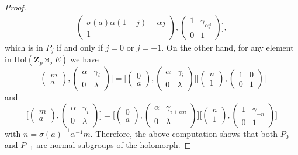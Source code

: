 \documentclass[12pt]{article}
\theoremstyle{definition}
\newcommand{\Z}{\mathbf Z}
\newcommand{\Hol}{\mathrm{Hol}}
\begin{document}
\begin{proof}
$$\begin{array}{l}
\begin{pmatrix}
	\sigma(a)\alpha(1+j)-\alpha j\\
	1
	\end{pmatrix}, \begin{pmatrix}
	1 &\gamma_{\alpha j}\\
	0 &1 
	\end{pmatrix}\Big],
\end{array}$$
which is in $P_j$ if and only if $j=0$ or $j=-1$.  
On the other hand, for any element in $\Hol(\Z_p\rtimes_{\sigma}E)$ we have
$$
\Big[\begin{pmatrix}
	m\\
	a
	\end{pmatrix}, \begin{pmatrix}
	\alpha &\gamma_{i}\\
	0&\lambda
	\end{pmatrix}\Big]
 =
 \Big[\begin{pmatrix}
	0\\
	a
	\end{pmatrix}, \begin{pmatrix}
	\alpha &\gamma_{i}\\
	0&\lambda
	\end{pmatrix}\Big]\Big[\begin{pmatrix}
 n
	\\
	1
	\end{pmatrix}, \begin{pmatrix}
	1 &0\\
	0&1
	\end{pmatrix}\Big]
 $$
 and
 $$
\Big[\begin{pmatrix}
	m\\
	a
	\end{pmatrix}, \begin{pmatrix}
	\alpha &\gamma_{i}\\
	0&\lambda
	\end{pmatrix}\Big]
 =
 \Big[\begin{pmatrix}
	0\\
	a
	\end{pmatrix}, \begin{pmatrix}
	\alpha &\gamma_{i+\alpha n}\\
	0&\lambda
	\end{pmatrix}\Big]\Big[\begin{pmatrix}
n
	\\
	1
	\end{pmatrix}, \begin{pmatrix}
	1 &\gamma_{-n}\\
	0&1
	\end{pmatrix}\Big]
 $$
with $n=\sigma(a)^{-1}\alpha^{-1}m$. Therefore, the above computation shows that both $P_0$ and $P_{-1}$ are normal subgroups of the holomorph. 
 \end{proof}
 
\end{document}
